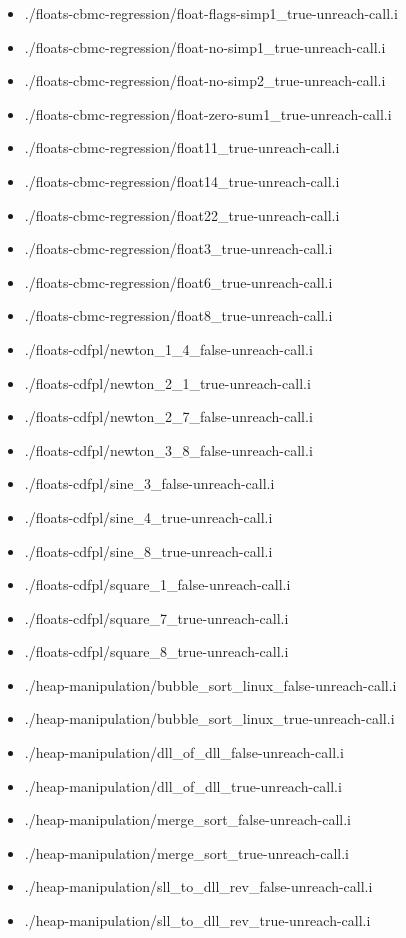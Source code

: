 \documentclass[envcountsame]{llncs}
\begin{document}
\begin{itemize}
\item ./floats-cbmc-regression/float-flags-simp1\_true-unreach-call.i
\item ./floats-cbmc-regression/float-no-simp1\_true-unreach-call.i
\item ./floats-cbmc-regression/float-no-simp2\_true-unreach-call.i
\item ./floats-cbmc-regression/float-zero-sum1\_true-unreach-call.i
\item ./floats-cbmc-regression/float11\_true-unreach-call.i
\item ./floats-cbmc-regression/float14\_true-unreach-call.i
\item ./floats-cbmc-regression/float22\_true-unreach-call.i
\item ./floats-cbmc-regression/float3\_true-unreach-call.i
\item ./floats-cbmc-regression/float6\_true-unreach-call.i
\item ./floats-cbmc-regression/float8\_true-unreach-call.i


\item ./floats-cdfpl/newton\_1\_4\_false-unreach-call.i
\item ./floats-cdfpl/newton\_2\_1\_true-unreach-call.i
\item ./floats-cdfpl/newton\_2\_7\_false-unreach-call.i
\item ./floats-cdfpl/newton\_3\_8\_false-unreach-call.i
\item ./floats-cdfpl/sine\_3\_false-unreach-call.i
\item ./floats-cdfpl/sine\_4\_true-unreach-call.i
\item ./floats-cdfpl/sine\_8\_true-unreach-call.i
\item ./floats-cdfpl/square\_1\_false-unreach-call.i
\item ./floats-cdfpl/square\_7\_true-unreach-call.i
\item ./floats-cdfpl/square\_8\_true-unreach-call.i


\item ./heap-manipulation/bubble\_sort\_linux\_false-unreach-call.i
\item ./heap-manipulation/bubble\_sort\_linux\_true-unreach-call.i
\item ./heap-manipulation/dll\_of\_dll\_false-unreach-call.i
\item ./heap-manipulation/dll\_of\_dll\_true-unreach-call.i
\item ./heap-manipulation/merge\_sort\_false-unreach-call.i
\item ./heap-manipulation/merge\_sort\_true-unreach-call.i
\item ./heap-manipulation/sll\_to\_dll\_rev\_false-unreach-call.i
\item ./heap-manipulation/sll\_to\_dll\_rev\_true-unreach-call.i



\end{itemize}
\end{document}
